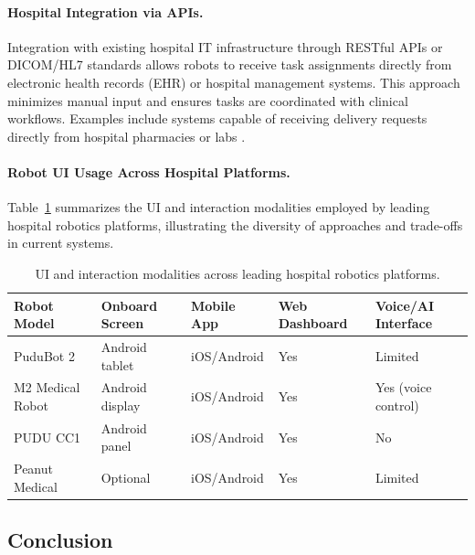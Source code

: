 \paragraph{Hospital Integration via APIs.}
Integration with existing hospital IT infrastructure through RESTful APIs or DICOM/HL7 standards allows robots to receive task assignments directly from electronic health records (EHR) or hospital management systems. This approach minimizes manual input and ensures tasks are coordinated with clinical workflows. Examples include systems capable of receiving delivery requests directly from hospital pharmacies or labs \cite{puducc1}.

\paragraph{Robot UI Usage Across Hospital Platforms.}
Table~\ref{tab:robot_ui} summarizes the UI and interaction modalities employed by leading hospital robotics platforms, illustrating the diversity of approaches and trade-offs in current systems.

\begin{table}[H]
\centering
\small
\begin{tabular}{|l|p{2cm}|p{2.5cm}|p{2.5cm}|p{2.5cm}|}
\hline
\textbf{Robot Model} & \textbf{Onboard Screen} & \textbf{Mobile App} & \textbf{Web Dashboard} & \textbf{Voice/AI Interface} \\
\hline
PuduBot 2 \cite{pudubot2} & Android tablet & iOS/Android & Yes & Limited \\
\hline
M2 Medical Robot \cite{m2medical} & Android display & iOS/Android & Yes & Yes (voice control) \\
\hline
PUDU CC1 \cite{puducc1} & Android panel & iOS/Android & Yes & No \\
\hline
Peanut Medical \cite{peanutmedical} & Optional & iOS/Android & Yes & Limited \\
\hline
\end{tabular}
\caption{UI and interaction modalities across leading hospital robotics platforms.}
\label{tab:robot_ui}
\end{table}

\clearpage

\subsection{Conclusion}

